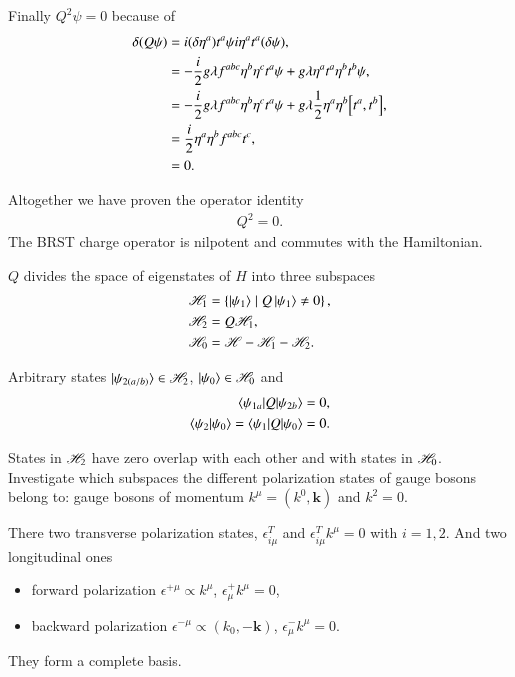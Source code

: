 Finally $Q^2 \psi = 0$ because of 
\begin{align*}
   \delta (Q \psi) &= i (\delta \eta^a) t^a \psi i \eta^a t^a (\delta \psi), \\
                 &= - \frac{i}{2} g \lambda f^{abc} \eta^b \eta^c t^a \psi + g \lambda \eta^a t^a \eta^b t^b \psi, \\
                 &= - \frac{i}{2} g \lambda f^{abc} \eta^b \eta^c t^a \psi + g \lambda\frac{1}{2} \eta^a \eta^b \comm{t^a}{t^b}, \\
                 &= \frac{i}{2} \eta^a \eta^b f^{abc} t^c, \\
                 &= 0.
\end{align*}

Altogether we have proven the operator identity
\begin{align}
   Q^2 = 0.
\end{align}
The BRST charge operator is nilpotent and commutes with the Hamiltonian.

$Q$ divides the space of eigenstates of $H$ into three subspaces
\begin{align*}
   \mathscr{H}_1 &= \left\{ \ket{\psi_1} \mid Q \ket{\psi_1} \neq 0 \right\}, \\
   \mathscr{H}_2 &= Q \mathscr{H}_1, \\
   \mathscr{H}_0 &= \mathscr{H} - \mathscr{H}_1 - \mathscr{H}_2.
\end{align*} 

Arbitrary states $\ket{\psi_{2(a/b)}} \in \mathscr{H}_2$, $\ket{\psi_0} \in \mathscr{H}_0$ and
\begin{align*}
   \braket{\psi_{1a} | Q | \psi_{2b}} = 0, \\
   \braket{\psi_2 | \psi_0} = \braket{\psi_1 | Q | \psi_0} = 0.
\end{align*}

States in $\mathscr{H}_2$ have zero overlap with each other and with  states in $\mathscr{H}_0$. Investigate which subspaces the different polarization states of gauge bosons belong to: gauge bosons of momentum $k^\mu = (k^0, \pmb{k})$ and $k^2 = 0$.

There two transverse polarization states, $\epsilon^T_{i \mu}$ and $\epsilon_{i\mu}^T k^\mu = 0$ with $i=1,2$. And two longitudinal ones 
\begin{itemize}
   \item  forward polarization $ \epsilon^{+\mu} \propto k^\mu$, $\epsilon^+_\mu k^\mu = 0 $,
   \item 
backward polarization
$\epsilon^{-\mu} \propto (k_0, -\pmb{k})$, $\epsilon^-_\mu k^\mu = 0$.
\end{itemize}
They form a complete basis.

